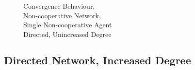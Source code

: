 \documentclass[a4paper, 12pt]{report}
\begin{document}
\begin{figure}[!htbp]
\begin{minipage}{.45\linewidth}
    \end{minipage}\par\medskip
    \centering
    
    \caption{Convergence Behaviour, \\ Non-cooperative Network, \\ Single Non-cooperative Agent \\ Directed, Unincreased Degree}
\end{figure}

\subsection{Directed Network, Increased Degree}
\end{document}
